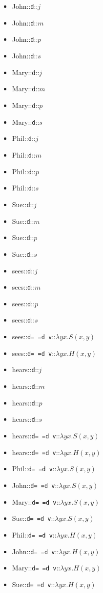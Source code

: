 \documentclass[11pt, a4paper]{article}
\newcommand{\lex}[3]{{#1}::{\texttt{#2}}::{$#3$}}
\begin{document}
\begin{footnotesize}
\begin{multicols}{3}
\begin{itemize}
  \item \lex{John}{d}{j}
  \item \lex{John}{d}{m}
  \item \lex{John}{d}{p}
  \item \lex{John}{d}{s}

  \item \lex{Mary}{d}{j}
  \item \lex{Mary}{d}{m}
  \item \lex{Mary}{d}{p}
  \item \lex{Mary}{d}{s}

  \item \lex{Phil}{d}{j}
  \item \lex{Phil}{d}{m}
  \item \lex{Phil}{d}{p}
  \item \lex{Phil}{d}{s}

  \item \lex{Sue}{d}{j}
  \item \lex{Sue}{d}{m}
  \item \lex{Sue}{d}{p}
  \item \lex{Sue}{d}{s}


  \item \lex{sees}{d}{j}
  \item \lex{sees}{d}{m}
  \item \lex{sees}{d}{p}
  \item \lex{sees}{d}{s}
  \item \lex{sees}{d=~=d~v}{\lambda yx. S(x, y)}
  \item \lex{sees}{d=~=d~v}{\lambda yx. H(x, y)}

  \item \lex{hears}{d}{j}
  \item \lex{hears}{d}{m}
  \item \lex{hears}{d}{p}
  \item \lex{hears}{d}{s}
  \item \lex{hears}{d=~=d~v}{\lambda yx. S(x, y)}
  \item \lex{hears}{d=~=d~v}{\lambda yx. H(x, y)}

  \item \lex{Phil}{d=~=d~v}{\lambda yx. S(x, y)}
  \item \lex{John}{d=~=d~v}{\lambda yx. S(x, y)}
  \item \lex{Mary}{d=~=d~v}{\lambda yx. S(x, y)}
  \item \lex{Sue}{d=~=d~v}{\lambda yx. S(x, y)}
  \item \lex{Phil}{d=~=d~v}{\lambda yx. H(x, y)}
  \item \lex{John}{d=~=d~v}{\lambda yx. H(x, y)}
  \item \lex{Mary}{d=~=d~v}{\lambda yx. H(x, y)}
  \item \lex{Sue}{d=~=d~v}{\lambda yx. H(x, y)}
\end{itemize}
\end{multicols}
\end{footnotesize}
\end{document}
